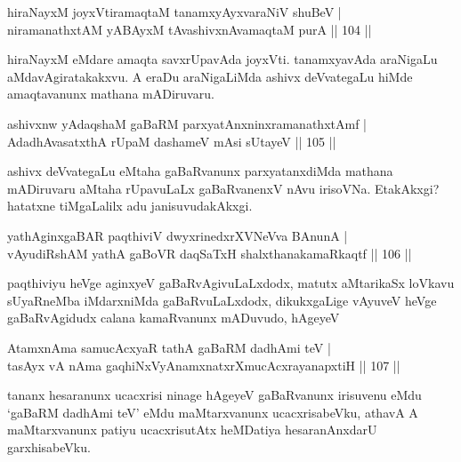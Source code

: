 
\begin{shl}
hiraNayxM joyxVtiramaqtaM tanamxyAyxvaraNiV shuBeV | \\
niramanathxtAM yABAyxM tAvashivxnAvamaqtaM purA \hfill|| 104 || 
\end{shl}

\begin{artha}
hiraNayxM eMdare amaqta savxrUpavAda joyxVti. tanamxyavAda araNigaLu 
aMdavAgiratakakxvu. A eraDu araNigaLiMda ashivx deVvategaLu hiMde 
amaqtavanunx mathana mADiruvaru.
\end{artha}

\begin{shl}
ashivxnw yAdaqshaM gaBaRM parxyatAnxninxramanathxtAmf | \\
AdadhAvasatxthA rUpaM dashameV mAsi sUtayeV \hfill|| 105 || 
\end{shl}

\begin{artha}
ashivx deVvategaLu eMtaha gaBaRvanunx parxyatanxdiMda mathana 
mADiruvaru aMtaha rUpavuLaLx gaBaRvanenxV nAvu irisoVNa. EtakAkxgi? 
hatatxne tiMgaLalilx adu janisuvudakAkxgi.
\end{artha}


\begin{shl}
yathA\s ginxgaBAR paqthiviV dwyxrinedxrXVNeVva BAnunA | \\
vAyudiRshAM yathA gaBoVR daqSaTxH shalxthanakamaRkaqtf \hfill|| 106 || 
\end{shl}

\begin{artha}
paqthiviyu heVge aginxyeV gaBaRvAgivuLaLxdodx, matutx aMtarikaSx 
loVkavu sUyaRneMba iMdarxniMda gaBaRvuLaLxdodx, dikukxgaLige vAyuveV
heVge gaBaRvAgidudx calana kamaRvanunx mADuvudo, hAgeyeV \ndash 
\end{artha}


\begin{shl}
AtamxnAma samucAcxyaR tathA gaBaRM dadhAmi teV | \\
tasAyx vA nAma gaqhiNxVyAnamxnatxrXmucAcxrayanapxtiH \hfill|| 107 ||  
\end{shl}

\begin{artha}
tananx hesaranunx ucacxrisi ninage hAgeyeV gaBaRvanunx irisuvenu eMdu 
`gaBaRM dadhAmi teV' eMdu maMtarxvanunx ucacxrisabeVku, athavA A 
maMtarxvanunx patiyu ucacxrisutAtx heMDatiya hesaranAnxdarU 
garxhisabeVku.
\end{artha}

